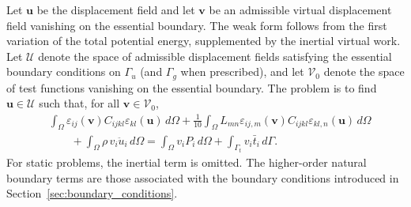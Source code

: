 \documentclass[final,3p,times,fleqn]{elsarticle}
\begin{document}
Let $\mathbf{u}$ be the displacement field and let $\mathbf{v}$ be an
admissible virtual displacement field vanishing on the essential
boundary. The weak form follows from the first variation of the total
potential energy, supplemented by the inertial virtual work. Let $\mathcal{U}$ denote the space of admissible displacement fields satisfying the essential boundary conditions on $\Gamma_u$ (and $\Gamma_g$ when prescribed), and let $\mathcal{V}_0$ denote the space of test functions vanishing on the essential boundary. The problem
is to find $\mathbf{u}\in\mathcal{U}$ such that, for all
$\mathbf{v}\in\mathcal{V}_0$,
\begin{align}
\label{eq:fem_weak_form_general}
&
\int_{\Omega}
\varepsilon_{ij}(\mathbf{v})C_{ijkl}\varepsilon_{kl}(\mathbf{u})
\,d\Omega
+
\frac{1}{10}
\int_{\Omega}
L_{mn}
\varepsilon_{ij,m}(\mathbf{v})
C_{ijkl}
\varepsilon_{kl,n}(\mathbf{u})
\,d\Omega
\nonumber\\
&\qquad
+
\int_{\Omega}
\rho\,v_i\ddot{u}_i\,d\Omega
=
\int_{\Omega}v_iP_i\,d\Omega
+
\int_{\Gamma_t}v_i\bar{t}_i\,d\Gamma .
\end{align}
For static problems, the inertial term is omitted. The higher-order
natural boundary terms are those associated with the boundary conditions
introduced in Section~\ref{sec:boundary_conditions}.
\end{document}
